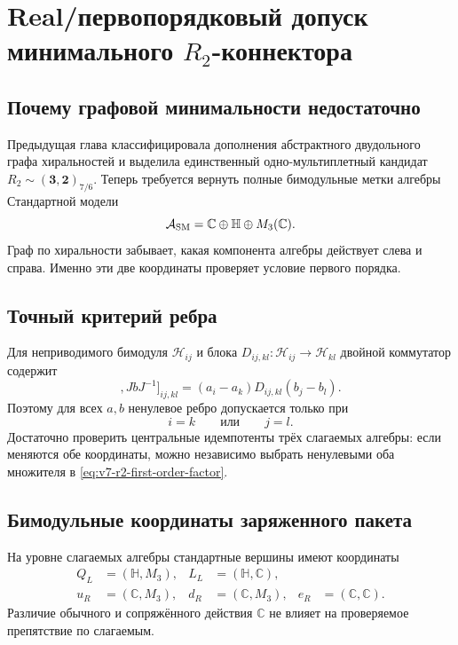 \chapter{Real/первопорядковый допуск минимального \texorpdfstring{$R_2$}{R2}-коннектора}
\label{ch:v7-r2-real-first-order-admission-gate}

\section{Почему графовой минимальности недостаточно}

Предыдущая глава классифицировала дополнения абстрактного двудольного графа
хиральностей и выделила единственный одно-мультиплетный кандидат
$R_2\sim(\mathbf3,\mathbf2)_{7/6}$. Теперь требуется вернуть полные
бимодульные метки алгебры Стандартной модели
\begin{equation}
 \mathcal A_{\rm SM}=\mathbb C\oplus\mathbb H\oplus M_3(\mathbb C).
 \label{eq:v7-r2-standard-algebra}
\end{equation}
Граф по хиральности забывает, какая компонента алгебры действует слева и
справа. Именно эти две координаты проверяет условие первого порядка.

\section{Точный критерий ребра}

Для неприводимого бимодуля $\mathcal H_{ij}$ и блока
$D_{ij,kl}:\mathcal H_{ij}\to\mathcal H_{kl}$ двойной коммутатор содержит
\begin{equation}
 [[D,a],JbJ^{-1}]_{ij,kl}
 =(a_i-a_k)D_{ij,kl}(b_j-b_l).
 \label{eq:v7-r2-first-order-factor}
\end{equation}
Поэтому для всех $a,b$ ненулевое ребро допускается только при
\begin{equation}
 i=k\qquad\text{или}\qquad j=l.
 \label{eq:v7-r2-same-row-column-criterion}
\end{equation}
Достаточно проверить центральные идемпотенты трёх слагаемых алгебры: если
меняются обе координаты, можно независимо выбрать ненулевыми оба множителя
в \eqref{eq:v7-r2-first-order-factor}.

\section{Бимодульные координаты заряженного пакета}

На уровне слагаемых алгебры стандартные вершины имеют координаты
\begin{align}
 Q_L&=(\mathbb H,M_3),& L_L&=(\mathbb H,\mathbb C),\nonumber\\
 u_R&=(\mathbb C,M_3),& d_R&=(\mathbb C,M_3),&
 e_R&=(\mathbb C,\mathbb C).
 \label{eq:v7-r2-bimodule-coordinates}
\end{align}
Различие обычного и сопряжённого действия $\mathbb C$ не влияет на
проверяемое препятствие по слагаемым.

